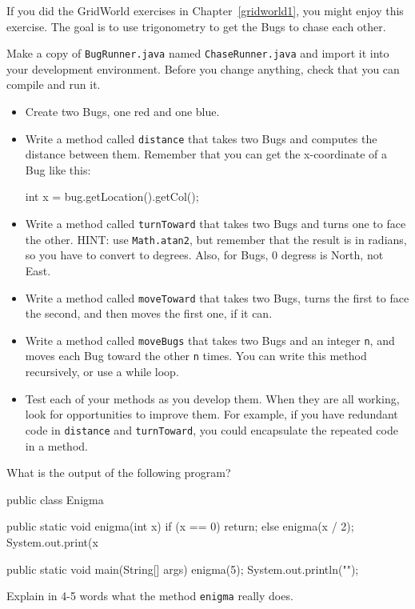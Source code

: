 \begin{exercise}
If you did the GridWorld exercises in Chapter~\ref{gridworld1}, you
might enjoy this exercise.  The goal is to use trigonometry to get the
Bugs to chase each other.

Make a copy of {\tt BugRunner.java} named {\tt ChaseRunner.java} and
import it into your development environment.  Before you change
anything, check that you can compile and run it.

\begin{itemize}

\item Create two Bugs, one red and one blue.

\item Write a method called {\tt distance} that takes two Bugs
and computes the distance between them.  Remember that you can
get the x-coordinate of a Bug like this:

\begin{code}
int x = bug.getLocation().getCol();
\end{code}

\item Write a method called {\tt turnToward} that takes two
Bugs and turns one to face the other.  HINT: use {\tt Math.atan2},
but remember that the result is in radians, so you have to
convert to degrees.  Also, for Bugs, 0 degress is North, not East.

\item Write a method called {\tt moveToward} that takes two
Bugs, turns the first to face the second, and then moves the
first one, if it can.

\item Write a method called {\tt moveBugs} that takes two Bugs
and an integer {\tt n}, and moves each Bug toward the other {\tt n}
times.  You can write this method recursively, or use a while loop.

\item Test each of your methods as you develop them.  When they are
  all working, look for opportunities to improve them.  For example,
  if you have redundant code in {\tt distance} and {\tt turnToward},
  you could encapsulate the repeated code in a method.

\end{itemize}
\end{exercise}


\begin{exercise}
What is the output of the following program?

\begin{code}
public class Enigma {

    public static void enigma(int x) {
        if (x == 0) {
            return;
        } else {
            enigma(x / 2);
        }
        System.out.print(x %
    }

    public static void main(String[] args) {
        enigma(5);
        System.out.println("");
    }
}
\end{code}

Explain in 4-5 words what the method {\tt enigma} really does.
\end{exercise}


